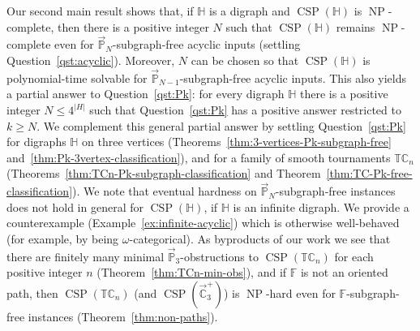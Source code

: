 \documentclass{article}
\theoremstyle{definition}
\theoremstyle{remark}
\DeclareMathOperator{\NP}{NP}
\DeclareMathOperator{\CSP}{CSP}
\newcommand{\bC}{{\mathbb C}}
\newcommand{\bF}{{\mathbb F}}
\newcommand{\bH}{{\mathbb H}}
\newcommand{\bP}{{\mathbb P}}
\newcommand{\bT}{{\mathbb T}}
\begin{document}
 Our second main result shows that, if $\bH$ is a digraph and $\CSP(\bH)$ is $\NP$-complete, then
 there is a positive integer $N$ such that $\CSP(\bH)$ remains $\NP$-complete
even for $\vec{\bP}_N$-subgraph-free acyclic inputs (settling Question~\ref{qst:acyclic}).
Moreover, $N$ can be chosen so that $\CSP(\bH)$ is polynomial-time solvable for
$\vec{\bP}_{N-1}$-subgraph-free acyclic inputs.
This also yields a partial answer to Question~\ref{qst:Pk}: for every digraph $\bH$
there is a positive integer $N\le 4^{|H|}$ such that Question~\ref{qst:Pk} has a positive
answer restricted to $k\ge N$. We complement this general partial answer by settling Question~\ref{qst:Pk}
for digraphs $\bH$ on three vertices (Theorems~\ref{thm:3-vertices-Pk-subgraph-free}
and~\ref{thm:Pk-3vertex-classification}), and for a family of smooth tournaments
$\bT\bC_n$ (Theorems~\ref{thm:TCn-Pk-subgraph-classification} and
Theorem~\ref{thm:TC-Pk-free-classification}). We note that eventual hardness on $\vec{\bP}_N$-subgraph-free
instances does not hold in general for $\CSP(\bH)$, if $\bH$ is an infinite digraph.
We provide a counterexample (Example~\ref{ex:infinite-acyclic}) which is otherwise well-behaved
(for example, by being $\omega$-categorical). As byproducts of our work we see that
there are finitely many minimal $\vec{\bP}_3$-obstructions to  $\CSP(\bT\bC_n)$ for each positive
integer $n$ (Theorem~\ref{thm:TCn-min-obs}), and if $\bF$ is not an oriented path, then
$\CSP(\bT\bC_n)$ (and $\CSP(\vec{\bC}_3^+)$) is $\NP$-hard even for $\bF$-subgraph-free instances
(Theorem~\ref{thm:non-paths}). 
\end{document}

